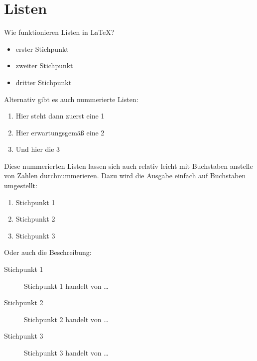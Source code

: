 \documentclass[11pt,a4paper,twoside]{scrreprt}
\begin{document}
\section{Listen}

Wie funktionieren Listen in \LaTeX{}?\\

\begin{itemize}
\item erster Stichpunkt 
\item zweiter Stichpunkt
\item dritter Stichpunkt
\end{itemize}

Alternativ gibt es auch nummerierte Listen:

\begin{enumerate}
\item Hier steht dann zuerst eine 1 
\item Hier erwartungsgem\"a\ss{} eine 2
\item Und hier die 3
\end{enumerate}


Diese nummerierten Listen lassen sich auch relativ leicht
mit Buchstaben anstelle von Zahlen durchnummerieren. 
Dazu wird die Ausgabe einfach auf Buchstaben umgestellt:


\renewcommand{\labelenumi}{\alph{enumi}}
\begin{enumerate}
\item Stichpunkt 1
\item Stichpunkt 2
\item Stichpunkt 3
\end{enumerate}

Oder auch die Beschreibung:

\begin{description}
\item[Stichpunkt 1]{ Stichpunkt 1 handelt von \dots}
\item[Stichpunkt 2]{ Stichpunkt 2 handelt von \dots}
\item[Stichpunkt 3]{ Stichpunkt 3 handelt von \dots}
\end{description}
\end{document}
